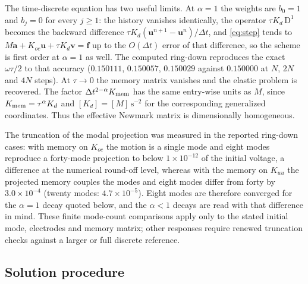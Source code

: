 The time-discrete equation has two useful limits. At $\alpha=1$ the weights are $b_0=1$ and
$b_j=0$ for every $j\ge1$: the history vanishes identically, the operator
$\tau K_d\,\mathrm{D}^{1}$ becomes the backward difference $\tau
K_d(\bm{u}^{n+1}-\bm{u}^{n})/\Delta t$, and \eqref{eq:step} tends to
$M\bm{a}+K_{oc}\bm{u}+\tau K_d\bm{v}=\bm{f}$ up to
the $O(\Delta t)$ error of that difference, so the scheme is first order at
$\alpha=1$ as well. The computed ring-down reproduces the exact $\omega\tau/2$ to that
accuracy ($0.150111$, $0.150057$, $0.150029$ against $0.150000$
at $N$, $2N$ and $4N$ steps).
At $\tau\to0$ the memory matrix vanishes and the elastic problem is recovered.
The factor $\Delta t^{2-\alpha}K_{\rm mem}$ has the same
entry-wise units as $M$, since $K_{\rm mem}=\tau^\alpha K_d$ and
$[K_d]=[M]\,\mathrm{s}^{-2}$ for the corresponding generalized coordinates.
Thus the effective Newmark matrix is dimensionally homogeneous.

The truncation of the modal projection was measured in the reported
ring-down cases: with memory on $K_{oc}$ the motion is a
single mode and eight modes reproduce a forty-mode projection to below
$1\times10^{-12}$ of the initial voltage, a difference at the numerical round-off level, whereas with the memory on $K_{uu}$ the projected memory
couples the modes and eight modes differ from forty by $3.0\times10^{-4}$
(twenty modes: $4.7\times10^{-5}$). Eight modes are therefore
converged for the $\alpha=1$ decay quoted below, and the $\alpha<1$ decays are
read with that difference in mind. These finite mode-count comparisons apply only to the stated initial mode, electrodes and memory matrix; other responses require renewed truncation checks against a larger or full discrete reference.

\FloatBarrier
\subsection{Solution procedure}
\label{sec:algorithm}

